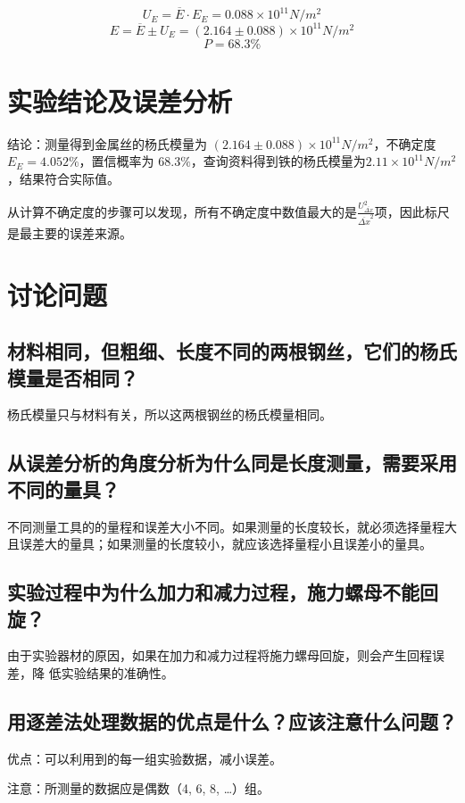 \documentclass{ctexart}
\begin{document}
~
$$U_E = \overline{E} \cdot E_E = 0.088 \times 10^{11} N/m^2 $$
$$ E = \overline{E} \pm U_E = (2.164 \pm 0.088) \times 10^{11} N/m^2 $$
$$P = 68.3\% $$
\newpage

\section{实验结论及误差分析}
结论：测量得到金属丝的杨氏模量为 $(2.164±0.088)×10^{11} N/m^2 $，不确定度 $ E_E =4.052\% $，置信概率为 $68.3\% $，查询资料得到铁的杨氏模量为$2.11 \times 10^{11} N/m^2$，结果符合实际值。 

从计算不确定度的步骤可以发现，所有不确定度中数值最大的是$\frac{U_{\overline{\Delta x}}^2}{\overline{\Delta x}^2}$项，因此标尺是最主要的误差来源。 
\section{讨论问题}

\subsection{材料相同，但粗细、长度不同的两根钢丝，它们的杨氏模量是否相同？}
杨氏模量只与材料有关，所以这两根钢丝的杨氏模量相同。
\subsection{从误差分析的角度分析为什么同是长度测量，需要采用不同的量具？}
不同测量工具的的量程和误差大小不同。如果测量的长度较长，就必须选择量程大且误差大的量具；如果测量的长度较小，就应该选择量程小且误差小的量具。
\subsection{实验过程中为什么加力和减力过程，施力螺母不能回旋？}
由于实验器材的原因，如果在加力和减力过程将施力螺母回旋，则会产生回程误差，降
低实验结果的准确性。
\subsection{用逐差法处理数据的优点是什么？应该注意什么问题？}
优点：可以利用到的每一组实验数据，减小误差。 

注意：所测量的数据应是偶数（4, 6, 8, …）组。
\end{document}
